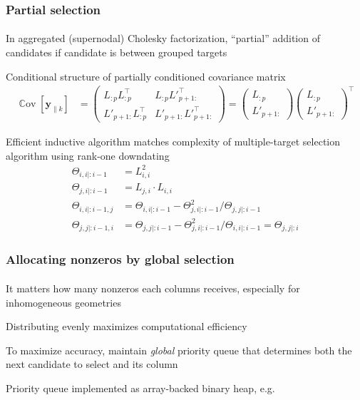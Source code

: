 \documentclass{beamer}                             %
\renewcommand*{\vec}[1]{\bm{#1}}
\newcommand*{\CM}{\Theta}
\DeclareMathOperator{\Cov}{\mathbb{C}ov}
\newenvironment{wideitemize}
  {\itemize\setlength{\itemsep}{0.5cm}}
  {\enditemize}
\begin{document}
\begin{frame}
\frametitle{Partial selection}
\framesubtitle{}

\begin{wideitemize}
  \item In aggregated (supernodal) Cholesky factorization, ``partial''
    addition of candidates if candidate is between grouped targets
  \item Conditional structure of partially conditioned covariance matrix
    \begin{align*}
      \Cov[\vec{y}_{\parallel k}] &=
      \begin{pmatrix}
        L_{:p} L_{:p}^{\top} &
        L_{:p} {L'}_{p + 1:}^{\top} \\
        {L'}_{p + 1:} L_{:p}^{\top} &
        {L'}_{p + 1:} {L'}_{p + 1:}^{\top}
      \end{pmatrix} =
      \begin{pmatrix}
        L_{:p} \\
        {L'}_{p + 1:}
      \end{pmatrix}
      \begin{pmatrix}
        L_{:p} \\
        {L'}_{p + 1:}
      \end{pmatrix}^{\top}
    \end{align*}
  \item Efficient inductive algorithm matches complexity of
    multiple-target selection algorithm using rank-one downdating
    \begin{align*}
      \CM_{i, i \mid :i - 1} &= L_{i, i}^2 \\
      \CM_{j, i \mid :i - 1} &= L_{j, i} \cdot L_{i, i} \\
      \CM_{i, i \mid :i - 1, j} &= \CM_{i, i \mid :i - 1} -
        \CM_{j, i \mid :i - 1}^2/\CM_{j, j \mid :i - 1} \\
      \CM_{j, j \mid :i - 1, i} &= \CM_{j, j \mid :i - 1} -
        \CM_{j, i \mid :i - 1}^2/\CM_{i, i \mid :i - 1} = \CM_{j, j \mid :i}
    \end{align*}
\end{wideitemize}
\end{frame}

\begin{frame}
\frametitle{Allocating nonzeros by global selection}
\framesubtitle{}

\begin{wideitemize}
  \item It matters how many nonzeros each columns
    receives, especially for inhomogeneous geometries
  \item Distributing evenly maximizes computational efficiency
  \item To maximize accuracy, maintain \emph{global} priority queue
    that determines both the next candidate to select and its column
  \item Priority queue implemented as array-backed binary heap, e.g.
\end{wideitemize}
\end{frame}
\end{document}
